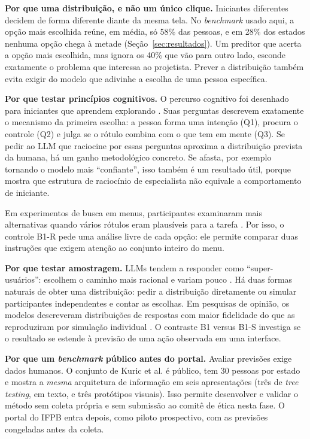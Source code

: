 \documentclass[12pt]{article}
\begin{document}
\textbf{Por que uma distribuição, e não um único clique.} Iniciantes diferentes decidem de forma diferente diante da mesma tela. No \textit{benchmark} usado aqui, a opção mais escolhida reúne, em média, só 58\% das pessoas, e em 28\% dos estados nenhuma opção chega à metade (Seção~\ref{sec:resultados}). Um preditor que acerta a opção mais escolhida, mas ignora os 40\% que vão para outro lado, esconde exatamente o problema que interessa ao projetista. Prever a distribuição também evita exigir do modelo que adivinhe a escolha de uma pessoa específica.

\textbf{Por que testar princípios cognitivos.} O percurso cognitivo foi desenhado para iniciantes que aprendem explorando \cite{polson1992cw,wharton1994cw}. Suas perguntas descrevem exatamente o mecanismo da primeira escolha: a pessoa forma uma intenção (Q1), procura o controle (Q2) e julga se o rótulo combina com o que tem em mente (Q3). Se pedir ao LLM que raciocine por essas perguntas aproxima a distribuição prevista da humana, há um ganho metodológico concreto. Se afasta, por exemplo tornando o modelo mais ``confiante'', isso também é um resultado útil, porque mostra que estrutura de raciocínio de especialista não equivale a comportamento de iniciante.

Em experimentos de busca em menus, participantes examinaram mais alternativas quando vários rótulos eram plausíveis para a tarefa \cite{brumby2008}. Por isso, o controle B1-R pede uma análise livre de cada opção: ele permite comparar duas instruções que exigem atenção ao conjunto inteiro do menu.

\textbf{Por que testar amostragem.} LLMs tendem a responder como ``super-usuários'': escolhem o caminho mais racional e variam pouco \cite{kuric2026wwgc,zhong2025syntheticcw}. Há duas formas naturais de obter uma distribuição: pedir a distribuição diretamente ou simular participantes independentes e contar as escolhas. Em pesquisas de opinião, os modelos descreveram distribuições de respostas com maior fidelidade do que as reproduziram por simulação individual \cite{meister2025}. O contraste B1 versus B1-S investiga se o resultado se estende à previsão de uma ação observada em uma interface.

\textbf{Por que um \textit{benchmark} público antes do portal.} Avaliar previsões exige dados humanos. O conjunto de Kuric et al. \cite{kuric2025ia} é público, tem 30 pessoas por estado e mostra a \emph{mesma} arquitetura de informação em seis apresentações (três de \textit{tree testing}, em texto, e três protótipos visuais). Isso permite desenvolver e validar o método sem coleta própria e sem submissão ao comitê de ética nesta fase. O portal do IFPB entra depois, como piloto prospectivo, com as previsões congeladas antes da coleta.
\end{document}

